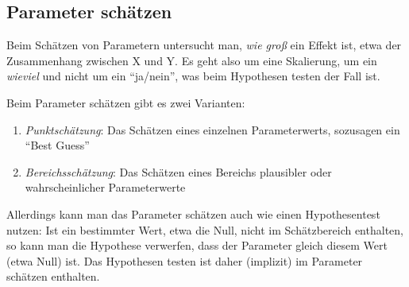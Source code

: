 \documentclass[
  ngerman,
  letterpaper,
  twoside,
  open=any]{scrbook}
\theoremstyle{definition}
\theoremstyle{plain}
\theoremstyle{definition}
\theoremstyle{definition}
\theoremstyle{definition}
\theoremstyle{definition}
\theoremstyle{remark}
\begin{document}
\subsection{Parameter schätzen}\label{parameter-schuxe4tzen}

Beim Schätzen von Parametern untersucht man, \emph{wie groß} ein Effekt
ist, etwa der Zusammenhang zwischen X und Y. Es geht also um eine
Skalierung, um ein \emph{wieviel} und nicht um ein \enquote{ja/nein},
was beim Hypothesen testen der Fall ist.

Beim Parameter schätzen gibt es zwei Varianten:

\begin{enumerate}
\def\labelenumi{\alph{enumi})}
\item
  \emph{Punktschätzung}: Das Schätzen eines einzelnen Parameterwerts,
  sozusagen ein \enquote{Best Guess}
\item
  \emph{Bereichsschätzung}: Das Schätzen eines Bereichs plausibler oder
  wahrscheinlicher Parameterwerte
\end{enumerate}

Allerdings kann man das Parameter schätzen auch wie einen Hypothesentest
nutzen: Ist ein bestimmter Wert, etwa die Null, nicht im Schätzbereich
enthalten, so kann man die Hypothese verwerfen, dass der Parameter
gleich diesem Wert (etwa Null) ist. Das Hypothesen testen ist daher
(implizit) im Parameter schätzen enthalten.
\end{document}
